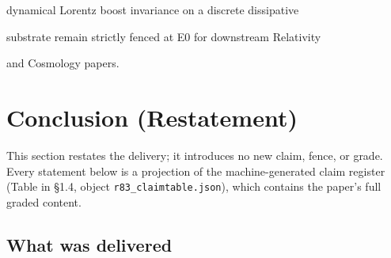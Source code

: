 \documentclass[11pt,a4paper]{article}
\theoremstyle{definition}
\begin{document}
dynamical Lorentz boost invariance on a discrete dissipative

substrate remain strictly fenced at E0 for downstream Relativity

and Cosmology papers.



\section{Conclusion (Restatement)}
\noindent This section restates the delivery; it introduces no new
claim, fence, or grade. Every statement below is a projection of the
machine-generated claim register (Table in \S1.4, object
\texttt{r83\_claimtable.json}), which contains the paper's full
graded content.

\subsection*{What was delivered}
\end{document}
